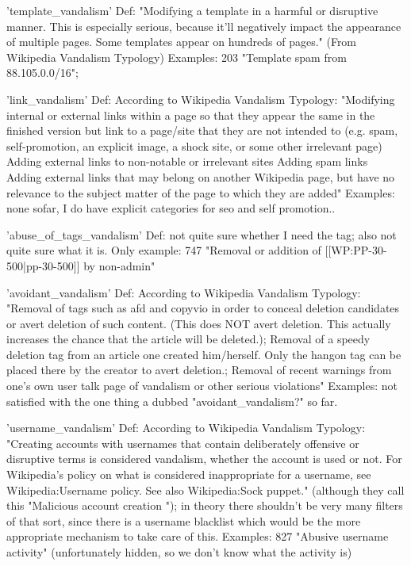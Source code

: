 'template\_vandalism'
  Def: "Modifying a template in a harmful or disruptive manner. This is especially serious, because it'll negatively impact the appearance of multiple pages. Some templates appear on hundreds of pages." (From Wikipedia Vandalism Typology)
  Examples: 203 "Template spam from 88.105.0.0/16";

'link\_vandalism'
  Def: According to Wikipedia Vandalism Typology: "Modifying internal or external links within a page so that they appear the same in the finished version but link to a page/site that they are not intended to (e.g. spam, self-promotion, an explicit image, a shock site, or some other irrelevant page)
    Adding external links to non-notable or irrelevant sites
    Adding spam links
    Adding external links that may belong on another Wikipedia page, but have no relevance to the subject matter of the page to which they are added"
  Examples: none sofar, I do have explicit categories for seo and self promotion.. %

'abuse\_of\_tags\_vandalism'
  Def: not quite sure whether I need the tag; also not quite sure what it is.
  Only example: 747 "Removal or addition of [[WP:PP-30-500|pp-30-500]] by non-admin"

'avoidant\_vandalism'
  Def: According to Wikipedia Vandalism Typology: "Removal of tags such as {{afd}} and {{copyvio}} in order to conceal deletion candidates or avert deletion of such content. (This does NOT avert deletion. This actually increases the chance that the article will be deleted.); Removal of a {{speedy deletion}} tag from an article one created him/herself. Only the {{hangon}} tag can be placed there by the creator to avert deletion.; Removal of recent warnings from one's own user talk page of vandalism or other serious violations"
  Examples: not satisfied with the one thing a dubbed "avoidant\_vandalism?" so far.

'username\_vandalism'
  Def: According to Wikipedia Vandalism Typology: "Creating accounts with usernames that contain deliberately offensive or disruptive terms is considered vandalism, whether the account is used or not. For Wikipedia's policy on what is considered inappropriate for a username, see Wikipedia:Username policy. See also Wikipedia:Sock puppet." (although they call this "Malicious account creation "); in theory there shouldn't be very many filters of that sort, since there is a username blacklist which would be the more appropriate mechanism to take care of this.
  Examples: 827 "Abusive username activity" (unfortunately hidden, so we don't know what the activity is)

